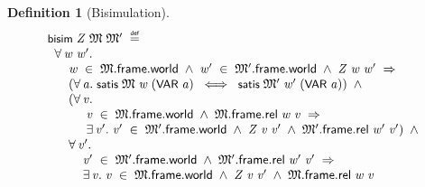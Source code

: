 \documentclass[letterpaper]{article}
\newtheorem{defn}{Definition}
\renewcommand{\HOLConst}[1]{{\textsf{\upshape\small #1}}}
\newenvironment{holmath}{\begin{displaymath}\begin{array}{l}}{\end{array}\end{displaymath}\ignorespacesafterend}
\begin{document}
\begin{defn}[Bisimulation]
\begin{holmath}
  \HOLConst{bisim}\;\HOLFreeVar{Z}\;\HOLFreeVar{\ensuremath{\mathfrak{M}}}\;\HOLFreeVar{\ensuremath{\mathfrak{M}'}}\;\HOLSymConst{\HOLTokenDefEquality{}}\\
\;\;\HOLSymConst{\HOLTokenForall{}}\HOLBoundVar{w}\;\HOLBoundVar{w\sp{\prime}}.\\
\;\;\;\;\;\;\HOLBoundVar{w}\;\HOLSymConst{\HOLTokenIn{}}\;\HOLFreeVar{\ensuremath{\mathfrak{M}}}.\HOLFieldName{frame}.\HOLFieldName{world}\;\HOLSymConst{\HOLTokenConj{}}\;\HOLBoundVar{w\sp{\prime}}\;\HOLSymConst{\HOLTokenIn{}}\;\HOLFreeVar{\ensuremath{\mathfrak{M}'}}.\HOLFieldName{frame}.\HOLFieldName{world}\;\HOLSymConst{\HOLTokenConj{}}\;\HOLFreeVar{Z}\;\HOLBoundVar{w}\;\HOLBoundVar{w\sp{\prime}}\;\HOLSymConst{\HOLTokenImp{}}\\
\;\;\;\;\;\;(\HOLSymConst{\HOLTokenForall{}}\HOLBoundVar{a}.\;\HOLConst{satis}\;\HOLFreeVar{\ensuremath{\mathfrak{M}}}\;\HOLBoundVar{w}\;(\HOLConst{VAR}\;\HOLBoundVar{a})\;\HOLSymConst{\HOLTokenEquiv{}}\;\HOLConst{satis}\;\HOLFreeVar{\ensuremath{\mathfrak{M}'}}\;\HOLBoundVar{w\sp{\prime}}\;(\HOLConst{VAR}\;\HOLBoundVar{a}))\;\HOLSymConst{\HOLTokenConj{}}\\
\;\;\;\;\;\;(\HOLSymConst{\HOLTokenForall{}}\HOLBoundVar{v}.\\
\;\;\;\;\;\;\;\;\;\;\;\HOLBoundVar{v}\;\HOLSymConst{\HOLTokenIn{}}\;\HOLFreeVar{\ensuremath{\mathfrak{M}}}.\HOLFieldName{frame}.\HOLFieldName{world}\;\HOLSymConst{\HOLTokenConj{}}\;\HOLFreeVar{\ensuremath{\mathfrak{M}}}.\HOLFieldName{frame}.\HOLFieldName{rel}\;\HOLBoundVar{w}\;\HOLBoundVar{v}\;\HOLSymConst{\HOLTokenImp{}}\\
\;\;\;\;\;\;\;\;\;\;\;\HOLSymConst{\HOLTokenExists{}}\HOLBoundVar{v\sp{\prime}}.\;\HOLBoundVar{v\sp{\prime}}\;\HOLSymConst{\HOLTokenIn{}}\;\HOLFreeVar{\ensuremath{\mathfrak{M}'}}.\HOLFieldName{frame}.\HOLFieldName{world}\;\HOLSymConst{\HOLTokenConj{}}\;\HOLFreeVar{Z}\;\HOLBoundVar{v}\;\HOLBoundVar{v\sp{\prime}}\;\HOLSymConst{\HOLTokenConj{}}\;\HOLFreeVar{\ensuremath{\mathfrak{M}'}}.\HOLFieldName{frame}.\HOLFieldName{rel}\;\HOLBoundVar{w\sp{\prime}}\;\HOLBoundVar{v\sp{\prime}})\;\HOLSymConst{\HOLTokenConj{}}\\
\;\;\;\;\;\;\HOLSymConst{\HOLTokenForall{}}\HOLBoundVar{v\sp{\prime}}.\\
\;\;\;\;\;\;\;\;\;\;\HOLBoundVar{v\sp{\prime}}\;\HOLSymConst{\HOLTokenIn{}}\;\HOLFreeVar{\ensuremath{\mathfrak{M}'}}.\HOLFieldName{frame}.\HOLFieldName{world}\;\HOLSymConst{\HOLTokenConj{}}\;\HOLFreeVar{\ensuremath{\mathfrak{M}'}}.\HOLFieldName{frame}.\HOLFieldName{rel}\;\HOLBoundVar{w\sp{\prime}}\;\HOLBoundVar{v\sp{\prime}}\;\HOLSymConst{\HOLTokenImp{}}\\
\;\;\;\;\;\;\;\;\;\;\HOLSymConst{\HOLTokenExists{}}\HOLBoundVar{v}.\;\HOLBoundVar{v}\;\HOLSymConst{\HOLTokenIn{}}\;\HOLFreeVar{\ensuremath{\mathfrak{M}}}.\HOLFieldName{frame}.\HOLFieldName{world}\;\HOLSymConst{\HOLTokenConj{}}\;\HOLFreeVar{Z}\;\HOLBoundVar{v}\;\HOLBoundVar{v\sp{\prime}}\;\HOLSymConst{\HOLTokenConj{}}\;\HOLFreeVar{\ensuremath{\mathfrak{M}}}.\HOLFieldName{frame}.\HOLFieldName{rel}\;\HOLBoundVar{w}\;\HOLBoundVar{v}
\end{holmath}
\end{defn}
\end{document}
